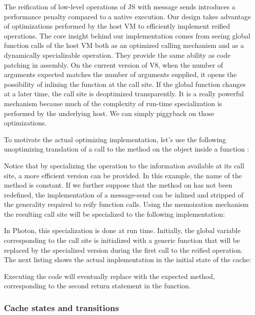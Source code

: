 The reification of low-level operations of JS with message sends introduces a
performance penalty compared to a native execution. Our design takes advantage
of optimizations performed by the host VM to efficiently implement reified
operations.  The core insight behind our implementation comes from seeing
global function calls of the host VM both as an optimized calling mechanism and
as a dynamically specializable operation. They provide the same ability as code
patching in assembly. On the current version of V8, when the number of
arguments expected matches the number of arguments supplied, it opens the
possibility of inlining the function at the call site. If the global function
changes at a later time, the call site is deoptimized transparently. It
is a really powerful mechanism because much of the complexity of run-time
specialization is performed by the underlying host.  We can simply piggyback on
those optimizations.

To motivate the actual optimizing implementation, let's use the following
unoptimizing translation of a call to the method  on the object
 inside a function :


Notice that by specializing the operation to the information available at its
call site, a more efficient version can be provided. In this example, the name
of the method is constant. If we further suppose that the  method on
 has not been redefined, the implementation of a
message-send can be inlined and stripped of the generality required to reify
function calls. Using the memoization mechanism the resulting call site will be
specialized to the following implementation:


In Photon, this specialization is done at run time. Initially, the global
variable corresponding to the call site is initialized with a generic function
that will be replaced by the specialized version during the first call to the
reified operation. The next listing shows the actual implementation in the
initial state of the cache:


Executing the code will eventually replace  with the expected
method, corresponding to the second return statement in the 
function.

\subsubsection{Cache states and transitions}

